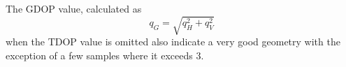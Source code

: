 The GDOP value, calculated as $$q_G=\sqrt{q^2_H+q^2_V}$$ when the TDOP value is omitted also indicate a very good geometry with the exception of a few samples where it exceeds 3. 

